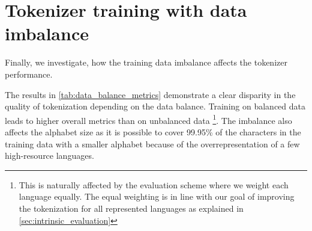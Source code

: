 \section{Tokenizer training with data imbalance}
\label{sec:tokenizer_training_with_data_imbalance}






Finally, we investigate, how the training data imbalance affects the tokenizer performance.

The results in \autoref{tab:data_balance_metrics} demonstrate a clear disparity in the quality of tokenization depending on the data balance. Training on balanced data leads to higher overall metrics than on unbalanced data \footnote{This is naturally affected by the evaluation scheme where we weight each language equally. The equal weighting is in line with our goal of improving the tokenization for all represented languages as explained in \autoref{sec:intrinsic_evaluation}}. The imbalance also affects the alphabet size as it is possible to cover 99.95\% of the characters in the training data with a smaller alphabet because of the overrepresentation of a few high-resource languages.

